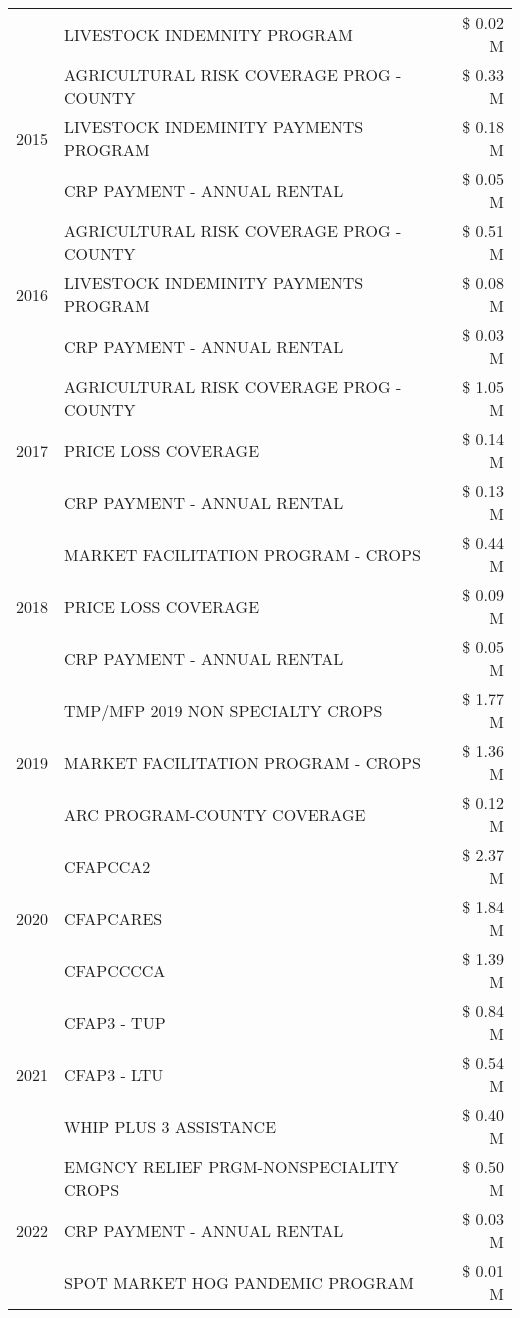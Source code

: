 \begin{tabular}{llr}
 & LIVESTOCK INDEMNITY PROGRAM & \$ 0.02 M \\
\cline{1-3}
\multirow[t]{3}{*}{2015} & AGRICULTURAL RISK COVERAGE PROG - COUNTY & \$ 0.33 M \\
 & LIVESTOCK INDEMINITY PAYMENTS PROGRAM & \$ 0.18 M \\
 & CRP PAYMENT - ANNUAL RENTAL & \$ 0.05 M \\
\cline{1-3}
\multirow[t]{3}{*}{2016} & AGRICULTURAL RISK COVERAGE PROG - COUNTY & \$ 0.51 M \\
 & LIVESTOCK INDEMINITY PAYMENTS PROGRAM & \$ 0.08 M \\
 & CRP PAYMENT - ANNUAL RENTAL & \$ 0.03 M \\
\cline{1-3}
\multirow[t]{3}{*}{2017} & AGRICULTURAL RISK COVERAGE PROG - COUNTY & \$ 1.05 M \\
 & PRICE LOSS COVERAGE & \$ 0.14 M \\
 & CRP PAYMENT - ANNUAL RENTAL & \$ 0.13 M \\
\cline{1-3}
\multirow[t]{3}{*}{2018} & MARKET FACILITATION PROGRAM - CROPS & \$ 0.44 M \\
 & PRICE LOSS COVERAGE & \$ 0.09 M \\
 & CRP PAYMENT - ANNUAL RENTAL & \$ 0.05 M \\
\cline{1-3}
\multirow[t]{3}{*}{2019} & TMP/MFP 2019 NON SPECIALTY CROPS & \$ 1.77 M \\
 & MARKET FACILITATION PROGRAM - CROPS & \$ 1.36 M \\
 & ARC PROGRAM-COUNTY COVERAGE & \$ 0.12 M \\
\cline{1-3}
\multirow[t]{3}{*}{2020} & CFAPCCA2 & \$ 2.37 M \\
 & CFAPCARES & \$ 1.84 M \\
 & CFAPCCCCA & \$ 1.39 M \\
\cline{1-3}
\multirow[t]{3}{*}{2021} & CFAP3 - TUP & \$ 0.84 M \\
 & CFAP3 - LTU & \$ 0.54 M \\
 & WHIP PLUS 3 ASSISTANCE & \$ 0.40 M \\
\cline{1-3}
\multirow[t]{3}{*}{2022} & EMGNCY RELIEF PRGM-NONSPECIALITY CROPS & \$ 0.50 M \\
 & CRP PAYMENT - ANNUAL RENTAL & \$ 0.03 M \\
 & SPOT MARKET HOG PANDEMIC PROGRAM & \$ 0.01 M \\
\cline{1-3}
\bottomrule
\end{tabular}
